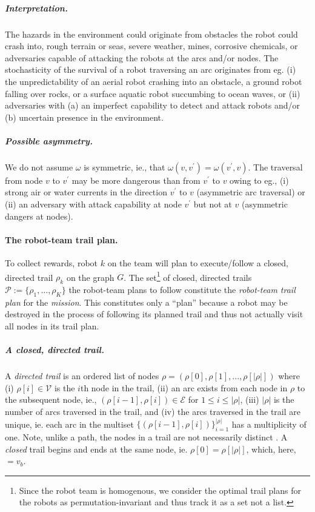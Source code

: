 \documentclass[11pt, oneside]{article}
\begin{document}
\vspace{-\baselineskip}
\subparagraph{Interpretation.} The hazards in the environment could originate from obstacles the robot could crash into, rough terrain or seas, severe weather, mines, corrosive chemicals, or adversaries capable of attacking the robots at the arcs and/or nodes.
The stochasticity of the survival of a robot traversing an arc originates from eg. (i) the unpredictability of an aerial robot crashing into an obstacle, a ground robot falling over rocks, or a surface aquatic robot succumbing to ocean waves, or (ii) adversaries with (a) an imperfect capability to detect and attack robots and/or (b) uncertain presence in the environment.

\vspace{-\baselineskip}
\subparagraph{Possible asymmetry.} We do not assume $\omega$ is symmetric, ie., that $\omega(v, v^\prime) = \omega(v^\prime, v)$. The traversal from node $v$ to $v^\prime$ may be more dangerous than from $v^\prime$ to $v$ owing to eg., (i) strong air or water currents in the direction $v^\prime$ to $v$ (asymmetric arc traversal) or (ii) an adversary with attack capability at node $v^\prime$ but not at $v$ (asymmetric dangers at nodes). %

\paragraph{The robot-team trail plan.}
To collect rewards, robot $k$ on the team will plan to execute/follow a closed, directed trail $\rho_k$ on the graph $G$.  
The set\footnote{Since the robot team is homogenous, we consider the optimal trail plans for the robots as permutation-invariant and thus track it as a set not a list.} of closed, directed trails $\mathcal{P}:=\{\rho_1, ..., \rho_K\}$ the robot-team plans to follow constitute the \emph{robot-team trail plan} for the \emph{mission}. 
This constitutes only a ``plan'' because a robot may be destroyed in the process of following its planned trail and thus not actually visit all nodes in its trail plan.

\vspace{-\baselineskip}
\subparagraph{A closed, directed trail.} 
A \emph{directed trail} is an ordered list of nodes $\rho = (\rho[0], \rho[1], ..., \rho[\lvert \rho \rvert])$ where
(i) $\rho[i] \in \mathcal{V}$ is the $i$th node in the trail,  
(ii) an arc exists from each node in $\rho$ to the subsequent node, ie., $(\rho[i-1], \rho[i])\in\mathcal{E}$ for $1 \leq i  \leq \lvert \rho \rvert$,
(iii) $\lvert \rho \rvert$ is the number of arcs traversed in the trail,
and
(iv) the arcs traversed in the trail are unique, ie. each arc in the multiset $\{(\rho[i-1], \rho[i])\}_{i=1}^{\lvert \rho \rvert}$ has a multiplicity of one.
Note, unlike a path, the nodes in a trail are not necessarily distinct \cite{wilson1979introduction}.
A \emph{closed} trail begins and ends at the same node, ie. $\rho [0]=\rho[\lvert \rho \rvert]$, which, here, $=v_b$.
\end{document}
